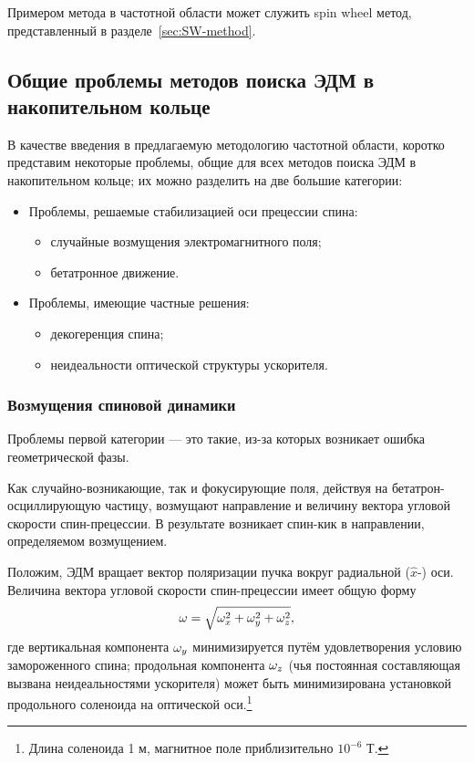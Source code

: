 Примером метода в частотной области может служить spin wheel метод, представленный в разделе~\ref{sec:SW-method}.

%

\subsection{Общие проблемы методов поиска ЭДМ в накопительном кольце}\label{sec:FSSREDM:problems}
В качестве введения в предлагаемую методологию частотной области, коротко представим 
некоторые проблемы, общие для всех методов поиска ЭДМ в накопительном кольце; их можно
разделить на две большие категории:

\begin{itemize}
	\item Проблемы, решаемые стабилизацией оси прецессии спина:
	\begin{itemize}
		\item случайные возмущения электромагнитного поля;
		\item бетатронное движение.
	\end{itemize}
	\item Проблемы, имеющие частные решения:
	\begin{itemize}
		\item декогеренция спина;
		\item неидеальности оптической структуры ускорителя.
	\end{itemize}
\end{itemize}

\subsubsection{Возмущения спиновой динамики}\label{chap1:par:smp}
Проблемы первой категории --- это такие, из-за которых возникает ошибка геометрической фазы.

Как случайно-возникающие, так и фокусирующие поля, действуя на бетатрон-осциллирующую частицу,
возмущают направление и величину вектора угловой скорости спин-прецессии. 
В результате возникает спин-кик в направлении, определяемом возмущением.

Положим, ЭДМ вращает вектор поляризации пучка вокруг радиальной ($\hat x$-) оси. 
Величина вектора угловой скорости спин-прецессии имеет общую форму
\[
\omega = \sqrt{\omega_x^2 + \omega_y^2 + \omega_z^2},
\]
где  вертикальная компонента $\omega_y$ минимизируется путём удовлетворения условию замороженного спина;
 продольная компонента $\omega_z$ (чья постоянная составляющая вызвана неидеальностями ускорителя) 
 может быть минимизирована установкой продольного соленоида на оптической оси.\footnote{Длина соленоида 1 м, 
 	магнитное поле приблизительно $10^{-6}$ Т.}

